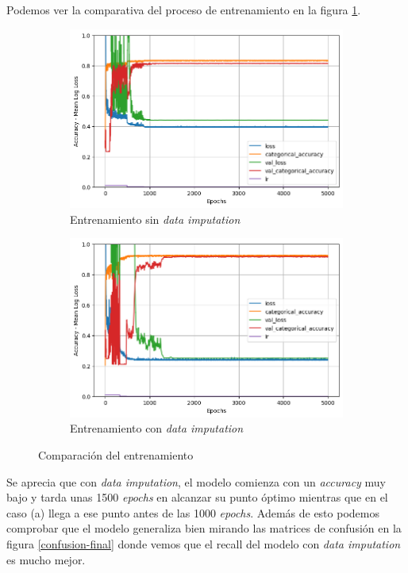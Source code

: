 \documentclass{article}
\begin{document}
Podemos ver la comparativa del proceso de entrenamiento en la figura \ref{comparativa-final}.
\begin{figure}[!h]
				\centering
     			\begin{subfigure}[b]{0.4\textwidth}
         			\centering
         			\includegraphics[scale=0.3]{finalsin.png}
         		\caption{Entrenamiento sin \textit{data imputation}}
         		\end{subfigure}
         		\hfill
     			\begin{subfigure}[b]{0.4\textwidth}
       				\centering
         			\includegraphics[scale=0.3]{finalcon.png}
         			\caption{Entrenamiento con \textit{data imputation}}
    		 	\end{subfigure}
    		 	\caption{Comparaci\'on del entrenamiento}
    		 	\label{comparativa-final}
			\end{figure}
Se aprecia que con \textit{data imputation}, el modelo comienza con un \textit{accuracy} muy bajo y tarda unas 1500 \textit{epochs} en alcanzar su punto \'optimo mientras que en el caso (a) llega a ese punto antes de las 1000 \textit{epochs}. Adem\'as de esto podemos comprobar que el modelo generaliza bien mirando las matrices de confusi\'on en la figura \ref{confusion-final} donde vemos que el recall del modelo con \textit{data imputation} es mucho mejor.
\end{document}
